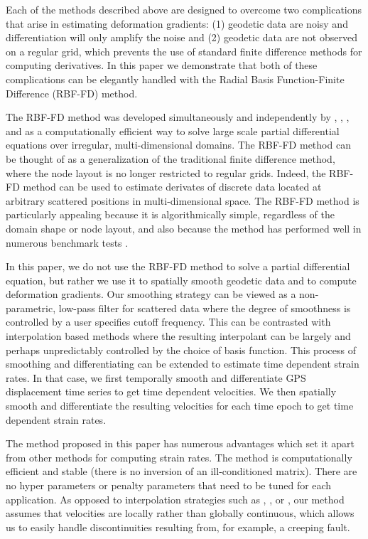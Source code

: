 \documentclass[10pt,a4paper]{article}
\begin{document}
Each of the methods described above are designed to overcome two complications that arise in estimating deformation gradients: (1) geodetic data are noisy and differentiation will only amplify the noise and (2) geodetic data are not observed on a regular grid, which prevents the use of standard finite difference methods for computing derivatives. In this paper we demonstrate that both of these complications can be elegantly handled with the Radial Basis Function-Finite Difference (RBF-FD) method.  

The RBF-FD method was developed simultaneously and independently by \citet{Tolstykh2003}, \citet{Shu2003}, \citet{Cecil2004}, and \citet{Wright2006} as a computationally efficient way to solve large scale partial differential equations over irregular, multi-dimensional domains.  The RBF-FD method can be thought of as a generalization of the traditional finite difference method, where the node layout is no longer restricted to regular grids. Indeed, the RBF-FD method can be used to estimate derivates of discrete data located at arbitrary scattered positions in multi-dimensional space.  The RBF-FD method is particularly appealing because it is algorithmically simple, regardless of the domain shape or node layout, and also because the method has performed well in numerous benchmark tests \citep[and references therein]{Fornberg2015}.

In this paper, we do not use the RBF-FD method to solve a partial differential equation, but rather we use it to spatially smooth geodetic data and to compute deformation gradients. Our smoothing strategy can be viewed as a non-parametric, low-pass filter for scattered data where the degree of smoothness is controlled by a user specifies cutoff frequency. This can be contrasted with interpolation based methods where the resulting interpolant can be largely and perhaps unpredictably controlled by the choice of basis function. This process of smoothing and differentiating can be extended to estimate time dependent strain rates.  In that case, we first temporally smooth and differentiate GPS displacement time series to get time dependent velocities.  We then spatially smooth and differentiate the resulting velocities for each time epoch to get time dependent strain rates.  

The method proposed in this paper has numerous advantages which set it apart from other methods for computing strain rates. The method is computationally efficient and stable (there is no inversion of an ill-conditioned matrix).  There are no hyper parameters or penalty parameters that need to be tuned for each application.  As opposed to interpolation strategies such as \citet{Beavan2001}, \citet{Tape2009}, or \citet{Ohtani2010}, our method assumes that velocities are locally rather than globally continuous, which allows us to easily handle discontinuities resulting from, for example, a creeping fault. 
\end{document}
